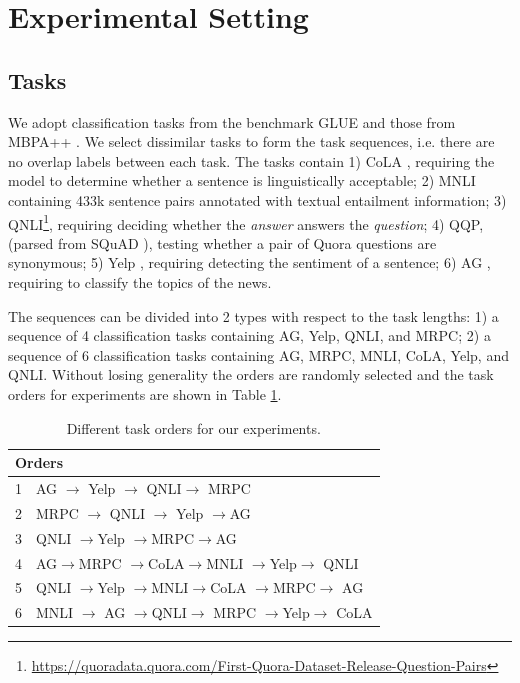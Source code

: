 \section{Experimental Setting}



\subsection{Tasks}
We adopt classification tasks from the benchmark GLUE \cite{wang2018glue} and those from MBPA++ \cite{huang2021continual,de2019episodic}. 
We select dissimilar tasks to form the task sequences, i.e. there are no overlap labels between each task.   The tasks contain 1) CoLA \cite{warstadt2019neural}, requiring the model to  determine whether a sentence is linguistically acceptable; 2) MNLI \cite{williams2017broad} containing 433k sentence pairs annotated with textual entailment information; 3) QNLI\footnote{\href{https://quoradata.quora.com/First-Quora-Dataset-Release-Question-Pairs}{https://quoradata.quora.com/First-Quora-Dataset-Release-Question-Pairs}}, requiring deciding whether the \textit{answer} answers the \textit{question}; 4) QQP, (parsed from SQuAD \cite{rajpurkarsquad}), testing whether a pair of Quora questions are synonymous; 5) Yelp \cite{zhang2015character}, requiring detecting the sentiment of a sentence; 6) AG \cite{zhang2015character}, requiring to classify the topics of the news. 

The sequences can be divided into 2 types with respect to the task lengths: 1) a sequence of 4 classification tasks containing AG, Yelp, QNLI, and MRPC; 2) a sequence of 6 classification tasks containing AG, MRPC, MNLI, CoLA, Yelp, and QNLI.  Without losing generality the orders are randomly selected and the task orders for experiments are shown in Table \ref{seq}.


\begin{table}[] \small
\centering
\begin{tabular}{ll}
\hline
\multicolumn{2}{l}{Orders}         \\ \hline

1      & AG $\rightarrow$ Yelp $\rightarrow$ QNLI$\rightarrow$ MRPC \\
2      & MRPC $\rightarrow$ QNLI $\rightarrow$ Yelp $\rightarrow$AG  \\
3      & QNLI $\rightarrow$Yelp $\rightarrow$MRPC$\rightarrow$AG \\ 
4 & AG$\rightarrow$MRPC $\rightarrow$CoLA$\rightarrow$MNLI $\rightarrow$Yelp$\rightarrow$ QNLI \\
5 & QNLI $\rightarrow$Yelp $\rightarrow$MNLI$\rightarrow$CoLA $\rightarrow$MRPC$\rightarrow$ AG \\
6 & MNLI $\rightarrow$ AG $\rightarrow$QNLI$\rightarrow$ 
 MRPC $\rightarrow$Yelp$\rightarrow$ CoLA \\
\hline
\end{tabular}
\caption{Different  task orders for our experiments.}
\label{seq}
    \vspace{-5mm}
\end{table}

